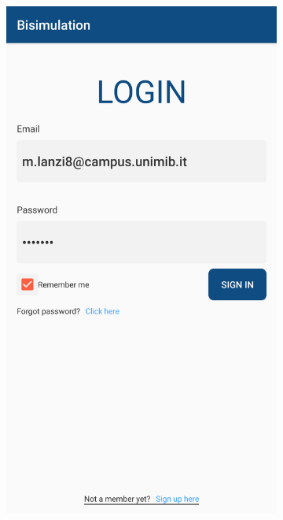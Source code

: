 \documentclass[a4paper,11pt,twoside,openright]{report}
\begin{document}
\begin{figure}[h]
\centering
\begin{subfigure}{.5\textwidth}
  \centering
  \includegraphics[width=.4\linewidth,height=860pt,keepaspectratio]{images/Login.png}

\end{subfigure}
\end{figure}
\end{document}
